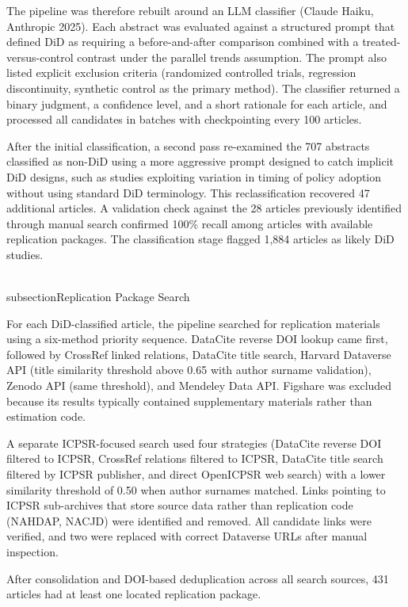 The pipeline was therefore rebuilt around an LLM classifier (Claude Haiku, Anthropic 2025). Each abstract was evaluated against a structured prompt that defined DiD as requiring a before-and-after comparison combined with a treated-versus-control contrast under the parallel trends assumption. The prompt also listed explicit exclusion criteria (randomized controlled trials, regression discontinuity, synthetic control as the primary method). The classifier returned a binary judgment, a confidence level, and a short rationale for each article, and processed all candidates in batches with checkpointing every 100 articles.

After the initial classification, a second pass re-examined the 707 abstracts classified as non-DiD using a more aggressive prompt designed to catch implicit DiD designs, such as studies exploiting variation in timing of policy adoption without using standard DiD terminology. This reclassification recovered 47 additional articles. A validation check against the 28 articles previously identified through manual search confirmed 100\% recall among articles with available replication packages. The classification stage flagged 1,884 articles as likely DiD studies.

\\subsection{Replication Package Search}

For each DiD-classified article, the pipeline searched for replication materials using a six-method priority sequence. DataCite reverse DOI lookup came first, followed by CrossRef linked relations, DataCite title search, Harvard Dataverse API (title similarity threshold above 0.65 with author surname validation), Zenodo API (same threshold), and Mendeley Data API. Figshare was excluded because its results typically contained supplementary materials rather than estimation code.

A separate ICPSR-focused search used four strategies (DataCite reverse DOI filtered to ICPSR, CrossRef relations filtered to ICPSR, DataCite title search filtered by ICPSR publisher, and direct OpenICPSR web search) with a lower similarity threshold of 0.50 when author surnames matched. Links pointing to ICPSR sub-archives that store source data rather than replication code (NAHDAP, NACJD) were identified and removed. All candidate links were verified, and two were replaced with correct Dataverse URLs after manual inspection.

After consolidation and DOI-based deduplication across all search sources, 431 articles had at least one located replication package.

